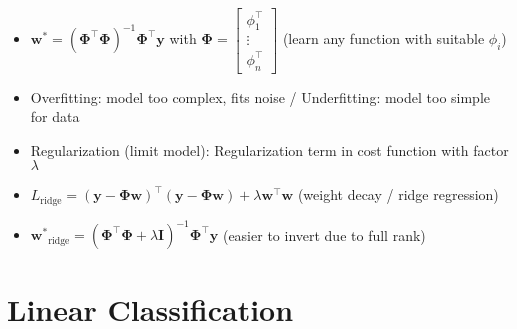 \documentclass[11pt]{scrartcl}
\begin{document}
\begin{itemize}
    \item \(\bm{w^*} = (\bm{\Phi}^\top \bm{\Phi})^{-1} \bm{\Phi}^\top \bm{y}\) with 
        \(\bm{\Phi} = \begin{bmatrix}
            \phi_1^\top \\
            \vdots \\
            \phi_n^\top
        \end{bmatrix}\) (learn any function with suitable \(\phi_i\)) 
    \item Overfitting: model too complex, fits noise / Underfitting: model too simple for data
    \item Regularization (limit model): Regularization term in cost function with factor 
        \(\lambda\)
    \item \(L_{\mathrm{ridge}} = (\bm{y} - \bm{\Phi} \bm{w})^\top (\bm{y} - \bm{\Phi w}) + 
        \lambda \bm{w}^\top \bm{w}\) (weight decay / ridge regression)
    \item \(\bm{w^*}_{\mathrm{ridge}} = (\bm{\Phi}^\top \bm{\Phi} + \lambda \bm{I})^{-1} 
        \bm{\Phi}^\top \bm{y}\) (easier to invert due to full rank)
\end{itemize}

\section{Linear Classification}
\end{document}
